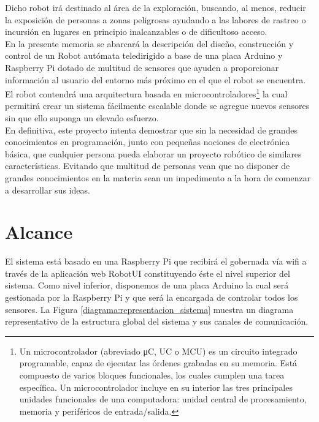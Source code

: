 Dicho robot irá destinado al área de la exploración, buscando, al menos, reducir la exposición de personas a zonas peligrosas ayudando a las labores de rastreo 
o incursión en lugares en principio inalcanzables o de dificultoso acceso.\\

En la presente memoria se abarcará la descripción del diseño, construcción y control de un Robot autómata teledirigido a base de una placa Arduino y Raspberry Pi dotado de multitud
de sensores que ayuden a proporcionar información al usuario del entorno más próximo en el que el robot se encuentra.\\

El robot contendrá una arquitectura basada en microcontroladores\footnote{Un microcontrolador (abreviado μC, UC o MCU) es un circuito integrado programable, capaz de 
ejecutar las órdenes grabadas en su memoria. Está compuesto de varios bloques funcionales, los cuales cumplen una tarea específica. Un microcontrolador incluye en su interior las
tres principales unidades funcionales de una computadora: unidad central de procesamiento, memoria y periféricos de entrada/salida. } la cual permitirá crear un sistema fácilmente escalable donde se agregue nuevos sensores sin que ello suponga 
un elevado esfuerzo.\\

En definitiva, este proyecto intenta demostrar que sin la necesidad de grandes conocimientos en programación, junto con pequeñas nociones de electrónica básica, que cualquier
persona pueda elaborar un proyecto robótico de similares características. Evitando que multitud de personas vean que no disponer de grandes conocimientos en la materia sean un
impedimento a la hora de comenzar a desarrollar sus ideas.\\

\section{Alcance}

El sistema está basado en una Raspberry Pi que recibirá el gobernada vía wifi a través de la aplicación web RobotUI constituyendo éste el nivel superior del sistema. Como nivel inferior, 
disponemos de una placa Arduino la cual será gestionada por la Raspberry Pi y que será la encargada de controlar todos los sensores. La Figura \ref{diagrama:representacion_sistema} muestra un diagrama representativo de la estructura
global del sistema y sus canales de comunicación.\\


